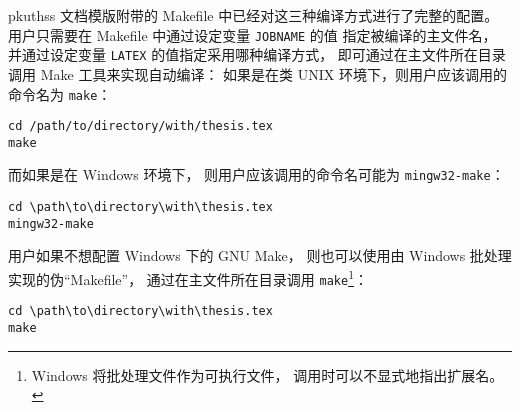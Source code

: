 	pkuthss 文档模版附带的 Makefile 中已经对这三种编译方式进行了完整的配置。
	用户只需要在 Makefile 中通过设定变量 \verb|JOBNAME| 的值%
	指定被编译的主文件名，
	并通过设定变量 \verb|LATEX| 的值指定采用哪种编译方式，
	即可通过在主文件所在目录调用 Make 工具来实现自动编译：
	如果是在类 UNIX 环境下，则用户应该调用的命令名为 \verb|make|：
\begin{Verbatim}[frame = single]
cd /path/to/directory/with/thesis.tex
make
\end{Verbatim}
	而如果是在 Windows 环境下，
	则用户应该调用的命令名可能为 \verb|mingw32-make|：
\begin{Verbatim}[frame = single]
cd \path\to\directory\with\thesis.tex
mingw32-make
\end{Verbatim}

	用户如果不想配置 Windows 下的 GNU Make，
	则也可以使用由 Windows 批处理实现的伪“Makefile”，
	通过在主文件所在目录调用 \verb|make|\footnote{%
		Windows 将批处理文件作为可执行文件，
		调用时可以不显式地指出扩展名。%
	}：
\begin{Verbatim}[frame = single]
cd \path\to\directory\with\thesis.tex
make
\end{Verbatim}

